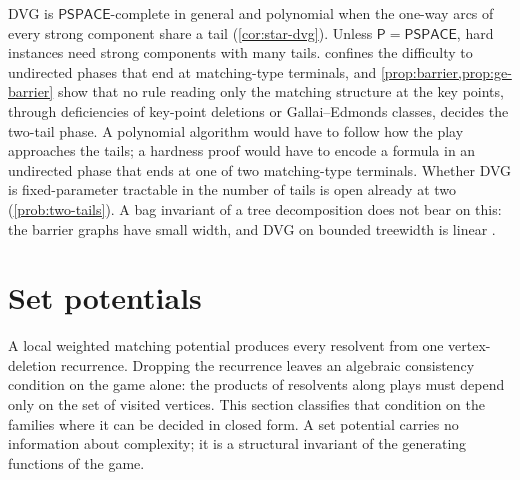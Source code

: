 \documentclass[final]{siamart0516}
\numberwithin{theorem}{section}
\numberwithin{equation}{section}
\theoremstyle{siamnonum}
\theoremstyle{plain}
\newcommand{\cls}[1]{\mathsf{#1}}
\newcommand{\PSPACE}{\cls{PSPACE}}
\newcommand{\Pclass}{\cls{P}}
\begin{document}
\begin{remark}\label{rem:tails-complexity}
DVG is $\PSPACE$-complete in general \cite{LichtensteinSipser} and polynomial when the one-way arcs of every strong component share a tail (\cref{cor:star-dvg}). Unless $\Pclass=\PSPACE$, hard instances need strong components with many tails.  confines the difficulty to undirected phases that end at matching-type terminals, and \cref{prop:barrier,prop:ge-barrier} show that no rule reading only the matching structure at the key points, through deficiencies of key-point deletions or Gallai--Edmonds classes, decides the two-tail phase. A polynomial algorithm would have to follow how the play approaches the tails; a hardness proof would have to encode a formula in an undirected phase that ends at one of two matching-type terminals. Whether DVG is fixed-parameter tractable in the number of tails is open already at two (\cref{prob:two-tails}). A bag invariant of a tree decomposition does not bear on this: the barrier graphs have small width, and DVG on bounded treewidth is linear \cite{Bodlaender}.
\end{remark}

\section{Set potentials}\label{sec:setpot}

A local weighted matching potential produces every resolvent from one vertex-deletion recurrence. Dropping the recurrence leaves an algebraic consistency condition on the game alone: the products of resolvents along plays must depend only on the set of visited vertices. This section classifies that condition on the families where it can be decided in closed form. A set potential carries no information about complexity; it is a structural invariant of the generating functions of the game.
\end{document}
